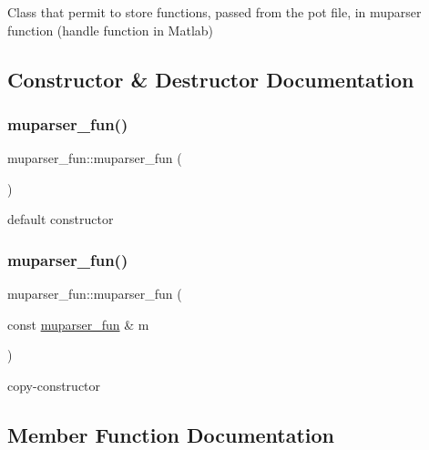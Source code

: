 Class that permit to store functions, passed from the pot file, in muparser function (handle function in Matlab) 

\subsection{Constructor \& Destructor Documentation}
\mbox{\label{classmuparser__fun_a17c98796657ea4da75ca6e273f0b6965}} 
\subsubsection{\texorpdfstring{muparser\+\_\+fun()}{muparser\_fun()}\hspace{0.1cm}{\footnotesize\ttfamily [1/2]}}
{\footnotesize\ttfamily muparser\+\_\+fun\+::muparser\+\_\+fun (\begin{DoxyParamCaption}{ }\end{DoxyParamCaption})\hspace{0.3cm}{\ttfamily [default]}}

default constructor \mbox{\label{classmuparser__fun_a106b21c0b17eb9fbc347fd510f617efb}} 
\subsubsection{\texorpdfstring{muparser\+\_\+fun()}{muparser\_fun()}\hspace{0.1cm}{\footnotesize\ttfamily [2/2]}}
{\footnotesize\ttfamily muparser\+\_\+fun\+::muparser\+\_\+fun (\begin{DoxyParamCaption}\item[{const \hyperlink{classmuparser__fun}{muparser\+\_\+fun} \&}]{m }\end{DoxyParamCaption})}

copy-\/constructor 

\subsection{Member Function Documentation}
\mbox{\label{classmuparser__fun_ad6ad244f299a60774735832c4ea28d66}} 
